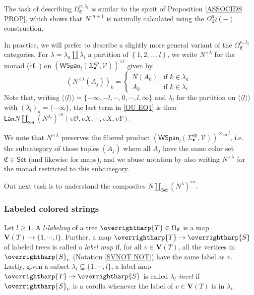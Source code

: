 \documentclass[a4paper,10pt
,draft
]{article}%
\numberwithin{equation}{section}
\numberwithin{figure}{section}
\theoremstyle{definition} %
\newcommand{\set}[1]{\left\{#1\right\}}%
\newcommand{\vect}[1]{\text{\overrightharp{\ensuremath{#1}}}}
\renewcommand{\O}{\ensuremath{\mathcal O}}
\newcommand{\1}{\ensuremath{\mathbbm 1}}%
\begin{document}
The task of describing 
$\Omega^{n,\lambda_l}_{\mathfrak{C}}$
is similar to the spirit of Proposition \ref{ASSOCIDS PROP}, which shows that
$N^{\circ n+1}$ is naturally calculated using the
$\Omega_{\mathfrak{C}}^{n} \wr (-)$ 
construction.

In practice, we will prefer to describe a slightly more general variant of the $\Omega^{n,\lambda_l}_{\mathfrak{C}}$ categories.
For $\lambda = \lambda_a \amalg \lambda_i$
a partition of $\set{1,2,\dots,l}$,
we write 
$N^{\times \lambda}$
for the monad (cf. \cite[\S 2.3]{BP_geo}) on 
$\left(\mathsf{WSpan}_l(\Sigma_{\bullet}^{op},\mathcal{V})\right)^{\times l}$
given by
\begin{equation}\label{NLAMBMON EQ}
\left(N^{\times \lambda} (A_j)\right)_k = 
\begin{cases}
N(A_k) & \text{if } k\in \lambda_a
\\
A_k & \text{if } k\in \lambda_i
\end{cases}
\end{equation}
Note that, writing 
$\langle\langle l\rangle\rangle = 
\{-\infty,-l,\cdots,0,\cdots,l,\infty\}$
and $\lambda_l$ for the partition on 
$\langle\langle l\rangle\rangle$ with
$\left(\lambda_l\right)_{a}=\{-\infty\}$,
the last term in \eqref{OU EQ1} is then
$\mathsf{Lan}N\coprod_{\mathsf{Set}}
\left(N^{\lambda_l}\right)^{\circ n}
(\upsilon\O,\upsilon X,\cdots,\upsilon X,\upsilon Y)$.

We note that $N^{\times \lambda}$
preserves the fibered product
$\left(\mathsf{WSpan}_l(\Sigma_{\bullet}^{op},\mathcal{V})\right)^{\times_{\mathsf{Set}} l}$,
i.e. the subcategory of those tuples $(A_j)$
where all $A_j$ have the same color set $\mathfrak{C} \in \mathsf{Set}$ (and likewise for maps), 
and we abuse notation by also writing 
$N^{\times \lambda}$
for the monad restricted to this subcategory.

Out next task is to understand the composites
$N\coprod_{\mathsf{Set}}
\left(N^{\lambda}\right)^{\circ n}$.

\subsubsection*{Labeled colored strings}
\label{LCS_SEC}

Let $l \geq 1$. A \emph{$l$-labeling} of a tree $\vect{T} \in \Omega_{\mathfrak{C}}$ is a map
$\boldsymbol{V}(T) \to \{1,\cdots,l\}$.
Further, a map 
$\vect{T} \to \vect{S}$ of labeled trees
is called a \emph{label map}
if, for all $v \in \boldsymbol{V}(T)$,
all the vertices in $\vect{S}_v$ (Notation \ref{SVNOT NOT})
have the same label as $v$.
Lastly, given a subset $\lambda_i \subseteq \{1,\cdots,l\}$,
a label map 
$\vect{T} \to \vect{S}$
is called \emph{$\lambda_i$-inert}
if $\vect{S}_v$ is a corolla whenever the label of
$v \in \boldsymbol{V}(T)$ is in $\lambda_i$.
\end{document}
